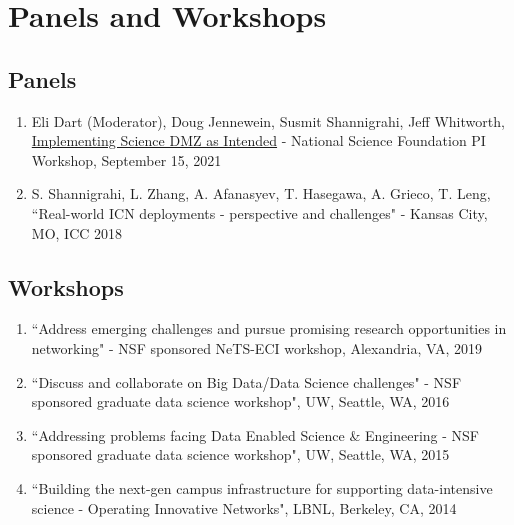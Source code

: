 \section{Panels and Workshops}

\subsection{Panels}

\begin{enumerate}

\item Eli Dart (Moderator), Doug Jennewein, Susmit Shannigrahi, Jeff Whitworth, \href{https://www.thequilt.net/public-event/2021-nsf-virtual-cc-pi-workshop/}{Implementing Science DMZ as Intended} - National Science Foundation PI Workshop, September 15, 2021

\item S. Shannigrahi, L. Zhang, A. Afanasyev, T. Hasegawa, A. Grieco, T. Leng, ``Real-world ICN deployments - perspective and challenges" - Kansas City, MO, ICC 2018
\end{enumerate}

\vspace{2em}


\subsection{Workshops}


\begin{enumerate}
	\item ``Address emerging challenges and pursue promising research opportunities in networking" - NSF sponsored NeTS-ECI workshop, Alexandria, VA, 2019
    \item ``Discuss and collaborate on Big Data/Data Science challenges" - NSF sponsored graduate data science workshop", UW, Seattle, WA, 2016
    \item ``Addressing problems facing Data Enabled Science \& Engineering - NSF sponsored graduate data science workshop", UW, Seattle, WA, 2015
    \item ``Building the next-gen campus infrastructure for supporting data-intensive science - Operating Innovative Networks", LBNL, Berkeley, CA, 2014
\end{enumerate}

\vspace{2em}
